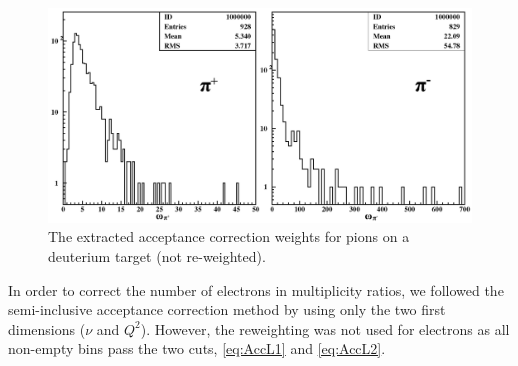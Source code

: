\begin{figure}[tbp]
\centering
\includegraphics[width=14cm] {chap5-fig/pawpipdeut.png}
\caption {The extracted acceptance correction weights for pions on a deuterium target (not re-weighted).}
\label{fig:AccCoef}
\end{figure}

In order to correct the number of electrons in multiplicity ratios, we followed the semi-inclusive acceptance correction method by using only the two first dimensions ($\nu$ and $Q^2$). However, the reweighting was not used for electrons as all non-empty bins pass the two cuts, \ref{eq:AccL1} and \ref{eq:AccL2}.

